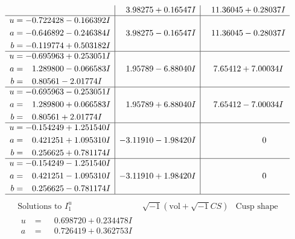 \documentclass[1p]{elsarticle_modified}
\theoremstyle{definition}
\newcommand{\I}{\sqrt{-1}}
\begin{document}
$$\begin{array}{c|c|c}
 & \phantom{-}3.98275 + 0.16547 I & \phantom{-}11.36045 + 0.28037 I \\ \hline\begin{aligned}
u &= -0.722428 - 0.166392 I \\
a &= -0.646892 - 0.246384 I \\
b &= -0.119774 + 0.503182 I\end{aligned}
 & \phantom{-}3.98275 - 0.16547 I & \phantom{-}11.36045 - 0.28037 I \\ \hline\begin{aligned}
u &= -0.695963 + 0.253051 I \\
a &= \phantom{-}1.289800 - 0.066583 I \\
b &= \phantom{-}0.80561 - 2.01774 I\end{aligned}
 & \phantom{-}1.95789 - 6.88040 I & \phantom{-}7.65412 + 7.00034 I \\ \hline\begin{aligned}
u &= -0.695963 - 0.253051 I \\
a &= \phantom{-}1.289800 + 0.066583 I \\
b &= \phantom{-}0.80561 + 2.01774 I\end{aligned}
 & \phantom{-}1.95789 + 6.88040 I & \phantom{-}7.65412 - 7.00034 I \\ \hline\begin{aligned}
u &= -0.154249 + 1.251540 I \\
a &= \phantom{-}0.421251 + 1.095310 I \\
b &= \phantom{-}0.256625 + 0.781174 I\end{aligned}
 & -3.11910 - 1.98420 I & \phantom{-0.000000 } 0 \\ \hline\begin{aligned}
u &= -0.154249 - 1.251540 I \\
a &= \phantom{-}0.421251 - 1.095310 I \\
b &= \phantom{-}0.256625 - 0.781174 I\end{aligned}
 & -3.11910 + 1.98420 I & \phantom{-0.000000 } 0\\
 \hline 
 \end{array}$$\newpage$$\begin{array}{c|c|c}  
\text{Solutions to }I^u_{1}& \I (\text{vol} + \sqrt{-1}CS) & \text{Cusp shape}\\
 \hline 
\begin{aligned}
u &= \phantom{-}0.698720 + 0.234478 I \\
a &= \phantom{-}0.726419 + 0.362753 I \\

\end{aligned}
\end{array}$$
\end{document}
